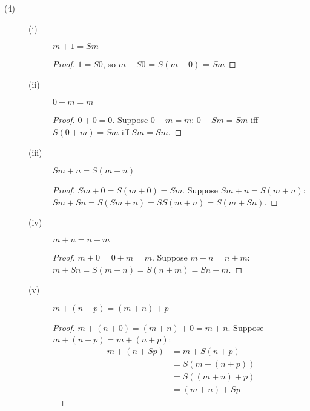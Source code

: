 \documentclass[12pt]{article}
\begin{document}
\begin{description}
\item[(4)] 
  \begin{description}
    \item[(i)] $m+1 = Sm$
	  \begin{proof}
	    $1 = S0$, so $m + S0$ = $S(m + 0)$ = $Sm$
	  \end{proof}
	\item[(ii)] $0+m = m$
	  \begin{proof}
	    $0+0=0$.  Suppose $0+m = m$: $0+Sm=Sm$ iff $S(0+m)=Sm$ iff  $Sm=Sm$.
	  \end{proof}
	\item[(iii)] $Sm+n = S(m+n)$
	  \begin{proof}
	    $Sm + 0 = S(m + 0) = Sm$.  Suppose $Sm+n = S(m+n)$: $Sm+Sn = S(Sm+n)
		= SS(m+n) = S(m+Sn)$.
	  \end{proof}
	\item[(iv)] $m+n=n+m$
	  \begin{proof}
	    $m+0 = 0+m = m$.  Suppose $m+n = n+m$:  $m+Sn = S(m+n) = S(n+m)
		= Sn + m$.
	  \end{proof}
	\item[(v)] $m+(n+p) = (m+n)+p$
	  \begin{proof}
	    $m+(n+0) = (m+n)+0 = m+n$.  Suppose $m+(n+p)=m+(n+p)$:
		\begin{align*}
		  m+(n+Sp) &= m+S(n+p) \\
		           &= S(m+(n+p)) \\
				   &= S((m+n)+p) \\
				   &= (m+n)+Sp
		\end{align*}
	  \end{proof}
  \end{description}


\end{description}
\end{document}
